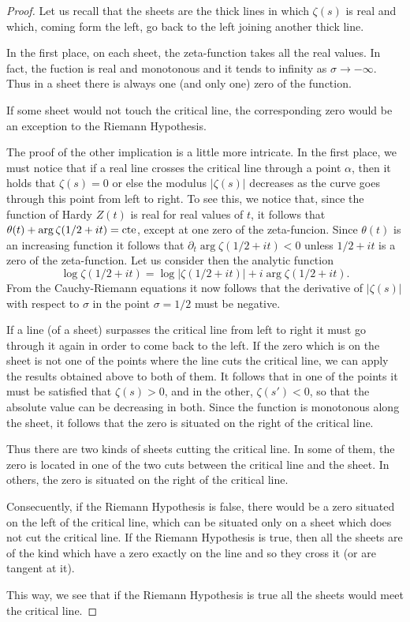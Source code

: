 \documentclass[a4paper]{amsart}
\numberwithin{equation}{section}
\begin{document}
\begin{proof}[Proof]
    Let us recall that the sheets are the thick lines in which $\zeta(s)$ is
real and which, coming form the left, go back to the left joining another 
thick line.

In the first place, on each sheet, the zeta-function takes all the
real values. In fact, the fuction is real and monotonous and it
tends to infinity as $\sigma \to -\infty$. Thus in a sheet
there is always one (and only one) zero of the function.
\medskip

If some sheet would not touch the critical line, the corresponding zero would
be an exception to the Riemann Hypothesis.
\bigskip

The proof of the other implication is a little more intricate. In the first
place, we must notice that if a real line crosses the critical line through a
point $\alpha$, then it holds that $\zeta(s)=0$ or else the modulus
$|\zeta(s)|$ decreases as the curve goes through this point from left
to right. To see this, we notice that, since the function of Hardy $Z(t)$ is
real for real values of $t$, it follows that $\theta(t) + \arg\zeta(1/2 + it)=
\hbox{cte}$, except  at one zero of the zeta-funcion.
Since $\theta(t)$ is an increasing function it follows that  
$\partial_{t}\arg\zeta(1/2+it)<0$ unless $1/2+it$ is a zero of the 
zeta-function. 
Let us consider then the
analytic function
$$\log\zeta(1/2+it)=\log|\zeta(1/2+it)|+i\arg\zeta(1/2+it).$$
From the Cauchy-Riemann equations it now follows that the derivative of
$|\zeta(s)|$ with respect to $\sigma$ in the point $\sigma=1/2$ must be
negative.
\medskip

If a line (of a sheet) surpasses the critical line from left to right it must
go through it again in order to come back to the left. If the zero which is on
the sheet is not one of the points where the line cuts the critical line, we
can apply the results obtained above to both of them. It follows that in one of
the points it must be satisfied that $\zeta(s)>0$, and in the other,
$\zeta(s')<0$, so that the absolute value can be decreasing in both. Since the
function is monotonous along the sheet, it follows that the zero is situated on
the right of the critical line.

Thus there are two kinds of sheets cutting the critical line. In some of them,
the zero is located in one of the two cuts between the critical line and 
the sheet. In
others, the zero is situated on the right of the critical line.


Consecuently, if the Riemann Hypothesis is false, there would be a zero
situated on the left of the critical line, which can be situated only on a
sheet which does not cut the critical line. If the Riemann Hypothesis is true,
then all the sheets are of the kind which have a zero exactly on the line and
so they cross it (or are tangent at it).
 
This way, we see that if the Riemann Hypothesis is true all the sheets would
meet the critical line.
\end{proof}
\end{document}

